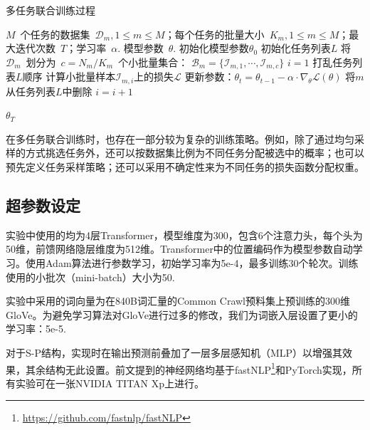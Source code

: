 \begin{algorithm}
	\caption{多任务联合训练过程}
	\label{alg:train}
	\begin{algorithmic}[1]
		\Require $M$~个任务的数据集~$\mathcal{D}_m, 1\le m \le M$；每个任务的批量大小~$K_m, 1\le m \le M$；最大迭代次数~$T$；学习率~$\alpha$.
		\Ensure 模型参数~$\theta$.
		\State 初始化模型参数$\theta_0$
		\State 初始化任务列表$L$
				\State 将~$\mathcal{D}_m$~划分为~$c=N_m/K_m$~个小批量集合：
				$\mathcal{B}_m = \{ \mathcal{I}_{m,1},\cdots, \mathcal{I}_{m,c} \}$
			\EndFor
			\State $i = 1$
			\State 打乱任务列表$L$顺序
			\State 计算小批量样本$\mathcal{I}_{m,i}$上的损失$\mathcal{L}$
			\State 更新参数：$\theta_t = \theta_{t-1}-\alpha \cdot \nabla_\theta \mathcal{L}(\theta) $
			\Else 
			\State 将$m$从任务列表$L$中删除
			\EndIf
			\EndFor
			\State $i = i + 1$
			\EndWhile

		\EndFor
		\State \Return $\theta_T$
		\EndFunction
	\end{algorithmic}
\end{algorithm}

在多任务联合训练时，也存在一部分较为复杂的训练策略。例如，除了通过均匀采样的方式挑选任务外，还可以按数据集比例为不同任务分配被选中的概率\cite{sanh2018hierarchical}；也可以预先定义任务采样策略\cite{DBLP:journals/tacl/KiperwasserB18}；还可以采用不确定性来为不同任务的损失函数分配权重\cite{DBLP:conf/cvpr/KendallGC18}。

\subsection{超参数设定}
实验中使用的均为4层Transformer，模型维度为300，包含6个注意力头，每个头为50维，前馈网络隐层维度为512维。Transformer中的位置编码作为模型参数自动学习。使用Adam算法\cite{kingma2015adam}进行参数学习，初始学习率为5e-4，最多训练30个轮次。训练使用的小批次（mini-batch）大小为50. 

实验中采用的词向量为在840B词汇量的Common Crawl预料集上预训练的300维GloVe\cite{DBLP:conf/emnlp/PenningtonSM14}。为避免学习算法对GloVe进行过多的修改，我们为词嵌入层设置了更小的学习率：5e-5.

对于S-P结构，实现时在输出预测前叠加了一层多层感知机（MLP）以增强其效果，其余结构无此设置。前文提到的神经网络均基于fastNLP\footnote{\url{https://github.com/fastnlp/fastNLP}}和PyTorch实现，所有实验可在一张NVIDIA TITAN Xp上进行。